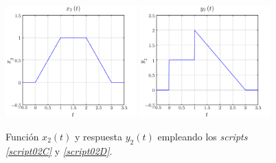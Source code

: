 \documentclass[a4paper,12pt,final]{article}
\begin{document}
      \begin{figure}[H]
          \caption{Función $x_2\left(t\right)$ y respuesta $y_2\left(t\right)$ empleando los \emph{scripts \ref{script02C}} y \emph{\ref{script02D}}.}
          \label{script02Afigure}
          \begin{center}
              \includegraphics[width=0.45\textwidth]{./laboratorio_3/problema02_X2.png}
              \includegraphics[width=0.45\textwidth]{./laboratorio_3/problema02_Y2.png}
          \end{center}
      \end{figure}
\end{document}

